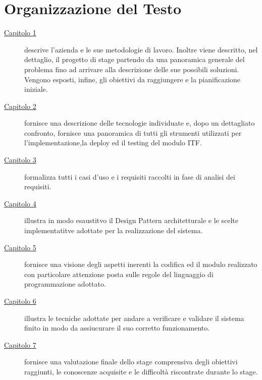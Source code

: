 
\cleardoublepage
{}
{}
\begingroup
\let\clearpage\relax
\let\cleardoublepage\relax
\let\cleardoublepage\relax

\chapter*{Organizzazione del Testo}

\begin{description}
	\item[{\hyperref[cap:introduzione]{Capitolo 1}}] descrive l'azienda e le sue metodologie di lavoro. Inoltre viene descritto, nel dettaglio, il progetto di stage partendo da una panoramica generale del problema fino ad arrivare alla descrizione delle sue possibili soluzioni. Vengono esposti, infine, gli obiettivi da raggiungere e la pianificazione iniziale.
	
	\item[{\hyperref[cap:tecnologie_e_strumenti]{Capitolo 2}}] fornisce una descrizione delle tecnologie individuate e, dopo un dettagliato confronto, fornisce una panoramica di tutti gli strumenti utilizzati per l'implementazione,la deploy ed il testing del modulo ITF. 
	
	\item[{\hyperref[cap:analisi_dei_requisiti]{Capitolo 3}}] formalizza tutti i casi d'uso e i requisiti raccolti in fase di analisi dei requisiti.
	
	\item[{\hyperref[cap:progettazione]{Capitolo 4}}] illustra in modo esaustitvo il Design Pattern architetturale e le scelte implementatitve adottate per la realizzazione del sistema.
	
	\item[{\hyperref[cap:codifica]{Capitolo 5}}] fornisce una visione degli aspetti inerenti la codifica ed il modulo realizzato con particolare attenzione posta sulle regole del linguaggio di programmazione adottato.
	
	\item[{\hyperref[cap:verifica_validazione]{Capitolo 6}}] illustra le tecniche adottate per andare a verificare e validare il sistema finito in modo da assiucurare il suo corretto funzionamento.
	
	\item[{\hyperref[cap:valutazione_finale]{Capitolo 7}}] fornisce una valutazione finale dello stage comprensiva degli obiettivi raggiunti, le conoscenze acquisite e le difficoltà riscontrate durante lo stage.
	
\end{description}

